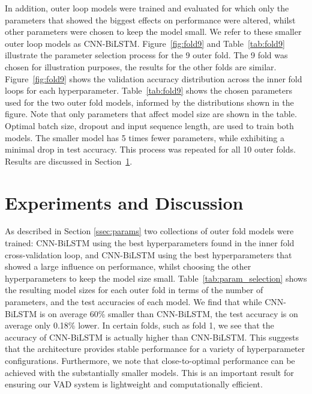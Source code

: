 \documentclass{article}
\begin{document}
In addition, outer loop models were trained and evaluated for which only the parameters that showed the biggest effects on performance were altered, whilst other parameters were chosen to keep the model small.
We refer to these smaller outer loop models as CNN-BiLSTM.
\mbox{Figure \ref{fig:fold9}} and \mbox{Table \ref{tab:fold9}} illustrate the parameter selection process for the 9 outer fold.
The 9 fold was chosen for illustration purposes, the results for the other folds are similar.
\mbox{Figure \ref{fig:fold9}} shows the validation accuracy distribution across the inner fold loops for each hyperparameter.
\mbox{Table \ref{tab:fold9}} shows the chosen parameters used for the two outer fold models, informed by the distributions shown in the figure.
Note that only parameters that affect model size are shown in the table.
Optimal batch size, dropout and input sequence length, are used to train both models.
The smaller model has 5 times fewer parameters, while exhibiting a minimal drop in test accuracy.
This process was repeated for all 10 outer folds.
Results are discussed in  \mbox{Section \ref{sec:experiments}}.

\vspace{-3mm}

\section{Experiments and Discussion}
\label{sec:experiments}

\vspace{-2mm}

As described in Section \ref{ssec:params} two collections of outer fold models were trained: CNN-BiLSTM using the best hyperparameters found in the inner fold cross-validation loop, and CNN-BiLSTM using the best hyperparameters that showed a large influence on performance, whilst choosing the other hyperparameters to keep the model size small.
\mbox{Table \ref{tab:param_selection}} shows the resulting model sizes for each outer fold in terms of the number of parameters, and the test accuracies of each model.
We find that while CNN-BiLSTM is on average 60\% smaller than CNN-BiLSTM, the test accuracy is on average only 0.18\% lower.
In certain folds, such as fold 1, we see that the accuracy of CNN-BiLSTM is actually higher than CNN-BiLSTM.
This suggests that the architecture provides stable performance for a variety of hyperparameter configurations.
Furthermore, we note that close-to-optimal performance can be achieved with the substantially smaller models.
This is an important result for ensuring our VAD system is lightweight and computationally efficient.
\end{document}
